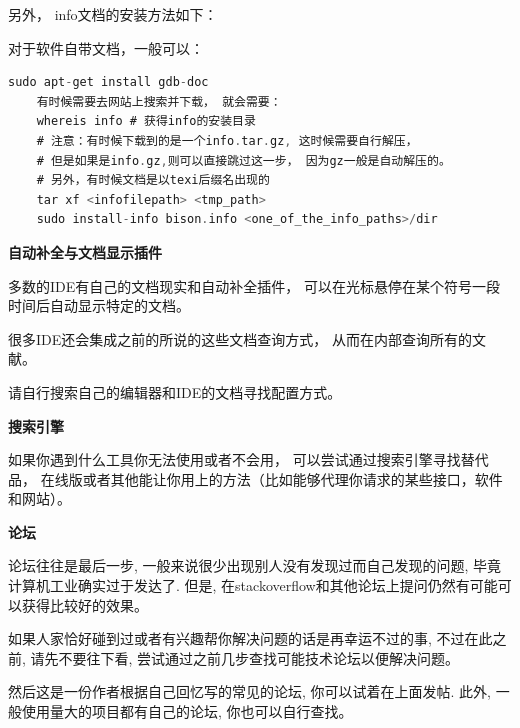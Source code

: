 另外， info文档的安装方法如下：

对于软件自带文档，一般可以：

\begin{lstlisting}[language={Rust}, label={code:forktest},
	caption={info}]
	sudo apt-get install gdb-doc
	有时候需要去网站上搜索并下载， 就会需要：
	whereis info # 获得info的安装目录
	# 注意：有时候下载到的是一个info.tar.gz, 这时候需要自行解压， 
	# 但是如果是info.gz,则可以直接跳过这一步， 因为gz一般是自动解压的。
	# 另外，有时候文档是以texi后缀名出现的
	tar xf <infofilepath> <tmp_path>
	sudo install-info bison.info <one_of_the_info_paths>/dir
\end{lstlisting}

\textbf{自动补全与文档显示插件}

多数的IDE有自己的文档现实和自动补全插件， 可以在光标悬停在某个符号一段时间后自动显示特定的文档。

很多IDE还会集成之前的所说的这些文档查询方式， 从而在内部查询所有的文献。

请自行搜索自己的编辑器和IDE的文档寻找配置方式。

\textbf{搜索引擎}

如果你遇到什么工具你无法使用或者不会用， 可以尝试通过搜索引擎寻找替代品， 在线版或者其他能让你用上的方法（比如能够代理你请求的某些接口，软件和网站）。

\textbf{论坛}

论坛往往是最后一步, 一般来说很少出现别人没有发现过而自己发现的问题, 毕竟计算机工业确实过于发达了. 但是, 在stackoverflow和其他论坛上提问仍然有可能可以获得比较好的效果。

如果人家恰好碰到过或者有兴趣帮你解决问题的话是再幸运不过的事, 不过在此之前, 请先不要往下看, 尝试通过之前几步查找可能技术论坛以便解决问题。

然后这是一份作者根据自己回忆写的常见的论坛, 你可以试着在上面发帖. 此外, 一般使用量大的项目都有自己的论坛, 你也可以自行查找。







